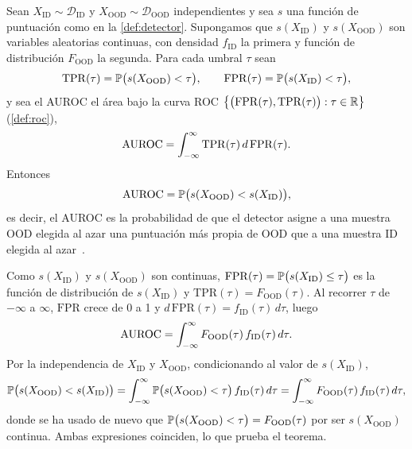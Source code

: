 \begin{teorema}\label{teo:auroc-prob}
Sean $X_{\mathrm{ID}} \sim \mathcal{D}_{\mathrm{ID}}$ y $X_{\mathrm{OOD}} \sim \mathcal{D}_{\mathrm{OOD}}$ independientes y sea $s$ una función de puntuación como en la \cref{def:detector}. Supongamos que $s(X_{\mathrm{ID}})$ y $s(X_{\mathrm{OOD}})$ son variables aleatorias continuas, con densidad $f_{\mathrm{ID}}$ la primera y función de distribución $F_{\mathrm{OOD}}$ la segunda. Para cada umbral $\tau$ sean
\[
  \mathrm{TPR}(\tau) = \mathbb{P}\bigl(s(X_{\mathrm{OOD}}) < \tau\bigr), \qquad
  \mathrm{FPR}(\tau) = \mathbb{P}\bigl(s(X_{\mathrm{ID}}) < \tau\bigr),
\]
y sea el AUROC el área bajo la curva ROC $\bigl\{\bigl(\mathrm{FPR}(\tau), \mathrm{TPR}(\tau)\bigr) : \tau \in \mathbb{R}\bigr\}$ (\cref{def:roc}),
\[
  \mathrm{AUROC} = \int_{-\infty}^{\infty} \mathrm{TPR}(\tau)\, d\,\mathrm{FPR}(\tau).
\]
Entonces
\[
  \mathrm{AUROC} = \mathbb{P}\bigl(s(X_{\mathrm{OOD}}) < s(X_{\mathrm{ID}})\bigr),
\]
es decir, el AUROC es la probabilidad de que el detector asigne a una muestra OOD elegida al azar una puntuación más propia de OOD que a una muestra ID elegida al azar~\cite{fawcett2006}.
\end{teorema}
\begin{demostracion}
Como $s(X_{\mathrm{ID}})$ y $s(X_{\mathrm{OOD}})$ son continuas, $\mathrm{FPR}(\tau) = \mathbb{P}\bigl(s(X_{\mathrm{ID}}) \le \tau\bigr)$ es la función de distribución de $s(X_{\mathrm{ID}})$ y $\mathrm{TPR}(\tau) = F_{\mathrm{OOD}}(\tau)$. Al recorrer $\tau$ de $-\infty$ a $\infty$, $\mathrm{FPR}$ crece de 0 a 1 y $d\,\mathrm{FPR}(\tau) = f_{\mathrm{ID}}(\tau)\, d\tau$, luego
\[
  \mathrm{AUROC} = \int_{-\infty}^{\infty} F_{\mathrm{OOD}}(\tau)\, f_{\mathrm{ID}}(\tau)\, d\tau .
\]
Por la independencia de $X_{\mathrm{ID}}$ y $X_{\mathrm{OOD}}$, condicionando al valor de $s(X_{\mathrm{ID}})$,
\[
  \mathbb{P}\bigl(s(X_{\mathrm{OOD}}) < s(X_{\mathrm{ID}})\bigr)
  = \int_{-\infty}^{\infty} \mathbb{P}\bigl(s(X_{\mathrm{OOD}}) < \tau\bigr)\, f_{\mathrm{ID}}(\tau)\, d\tau
  = \int_{-\infty}^{\infty} F_{\mathrm{OOD}}(\tau)\, f_{\mathrm{ID}}(\tau)\, d\tau ,
\]
donde se ha usado de nuevo que $\mathbb{P}\bigl(s(X_{\mathrm{OOD}}) < \tau\bigr) = F_{\mathrm{OOD}}(\tau)$ por ser $s(X_{\mathrm{OOD}})$ continua. Ambas expresiones coinciden, lo que prueba el teorema.
\end{demostracion}

